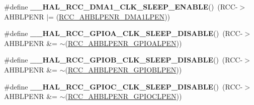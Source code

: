 \begin{DoxyCompactItemize}
\item 
\hypertarget{group___r_c_c___peripheral___clock___sleep___enable___disable_ga568e4d004285fe009bc4e5d33e13af61}{\#define {\bfseries \-\_\-\-\_\-\-H\-A\-L\-\_\-\-R\-C\-C\-\_\-\-D\-M\-A1\-\_\-\-C\-L\-K\-\_\-\-S\-L\-E\-E\-P\-\_\-\-E\-N\-A\-B\-L\-E}()~(R\-C\-C-\/$>$A\-H\-B\-L\-P\-E\-N\-R $\vert$= (\hyperlink{group___peripheral___registers___bits___definition_ga8053aa13396d01a92ab6668dc18024b1}{R\-C\-C\-\_\-\-A\-H\-B\-L\-P\-E\-N\-R\-\_\-\-D\-M\-A1\-L\-P\-E\-N}))}\label{group___r_c_c___peripheral___clock___sleep___enable___disable_ga568e4d004285fe009bc4e5d33e13af61}

\item 
\hypertarget{group___r_c_c___peripheral___clock___sleep___enable___disable_gad6753edbd9047eeac39ae4f234642942}{\#define {\bfseries \-\_\-\-\_\-\-H\-A\-L\-\_\-\-R\-C\-C\-\_\-\-G\-P\-I\-O\-A\-\_\-\-C\-L\-K\-\_\-\-S\-L\-E\-E\-P\-\_\-\-D\-I\-S\-A\-B\-L\-E}()~(R\-C\-C-\/$>$A\-H\-B\-L\-P\-E\-N\-R \&= $\sim$(\hyperlink{group___peripheral___registers___bits___definition_ga8fdb2dae547fe9b89381c894ae21e08a}{R\-C\-C\-\_\-\-A\-H\-B\-L\-P\-E\-N\-R\-\_\-\-G\-P\-I\-O\-A\-L\-P\-E\-N}))}\label{group___r_c_c___peripheral___clock___sleep___enable___disable_gad6753edbd9047eeac39ae4f234642942}

\item 
\hypertarget{group___r_c_c___peripheral___clock___sleep___enable___disable_ga0a20ad851a2ef9e1ccdbf280dcd1dc44}{\#define {\bfseries \-\_\-\-\_\-\-H\-A\-L\-\_\-\-R\-C\-C\-\_\-\-G\-P\-I\-O\-B\-\_\-\-C\-L\-K\-\_\-\-S\-L\-E\-E\-P\-\_\-\-D\-I\-S\-A\-B\-L\-E}()~(R\-C\-C-\/$>$A\-H\-B\-L\-P\-E\-N\-R \&= $\sim$(\hyperlink{group___peripheral___registers___bits___definition_ga1943c1a7faf87f869a4a381bb17fb0ea}{R\-C\-C\-\_\-\-A\-H\-B\-L\-P\-E\-N\-R\-\_\-\-G\-P\-I\-O\-B\-L\-P\-E\-N}))}\label{group___r_c_c___peripheral___clock___sleep___enable___disable_ga0a20ad851a2ef9e1ccdbf280dcd1dc44}

\item 
\hypertarget{group___r_c_c___peripheral___clock___sleep___enable___disable_ga293f9870ba631d23f8011bad12420f83}{\#define {\bfseries \-\_\-\-\_\-\-H\-A\-L\-\_\-\-R\-C\-C\-\_\-\-G\-P\-I\-O\-C\-\_\-\-C\-L\-K\-\_\-\-S\-L\-E\-E\-P\-\_\-\-D\-I\-S\-A\-B\-L\-E}()~(R\-C\-C-\/$>$A\-H\-B\-L\-P\-E\-N\-R \&= $\sim$(\hyperlink{group___peripheral___registers___bits___definition_ga31961dd470a5be30373cd496ae6da055}{R\-C\-C\-\_\-\-A\-H\-B\-L\-P\-E\-N\-R\-\_\-\-G\-P\-I\-O\-C\-L\-P\-E\-N}))}\label{group___r_c_c___peripheral___clock___sleep___enable___disable_ga293f9870ba631d23f8011bad12420f83}


\end{DoxyCompactItemize}
